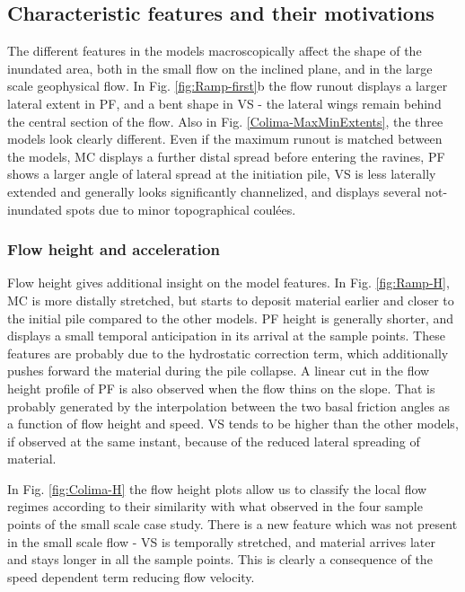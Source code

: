 \documentclass{article}
\begin{document}
\subsection{Characteristic features and their motivations}
The different features in the models macroscopically affect the shape of the inundated area, both in the small flow on the inclined plane, and in the large scale geophysical flow. In Fig. \ref{fig:Ramp-first}b the flow runout displays a larger lateral extent in PF, and a bent shape in VS - the lateral wings remain behind the central section of the flow. Also in Fig. \ref{Colima-MaxMinExtents}, the three models look clearly different. Even if the maximum runout is matched between the models, MC displays a further distal spread before entering the ravines, PF shows a larger angle of lateral spread at the initiation pile, VS is less laterally extended and generally looks significantly channelized, and displays several not-inundated spots due to minor topographical coul\'{e}es.

\subsubsection{Flow height and acceleration}
Flow height gives additional insight on the model features. In Fig. \ref{fig:Ramp-H}, MC is more distally stretched, but starts to deposit material earlier and closer to the initial pile compared to the other models. PF height is generally shorter, and displays a small temporal anticipation in its arrival at the sample points. These features are probably due to the hydrostatic correction term, which additionally pushes forward the material during the pile collapse. A linear cut in the flow height profile of PF is also observed when the flow thins on the slope. That is probably generated by the interpolation between the two basal friction angles as a function of flow height and speed. VS tends to be higher than the other models, if observed at the same instant, because of the reduced lateral spreading of material. 

In Fig. \ref{fig:Colima-H} the flow height plots allow us to classify the local flow regimes according to their similarity with what observed in the four sample points of the small scale case study. There is a new feature which was not present in the small scale flow - VS is temporally stretched, and material arrives later and stays longer in all the sample points. This is clearly a consequence of the speed dependent term reducing flow velocity.
\end{document}
